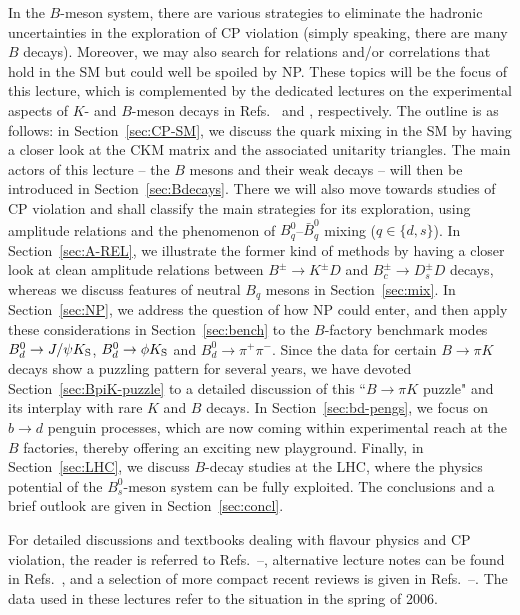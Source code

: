\documentclass[11pt]{cernrep}
\begin{document}
In the $B$-meson system, there are various strategies to eliminate
the hadronic uncertainties in the exploration of CP violation (simply
speaking, there are many $B$ decays). Moreover, we may also search
for relations and/or correlations that hold in the SM but could well be
spoiled by NP. These topics will be the focus of this lecture, which is
complemented by the dedicated lectures on the experimental aspects 
of $K$- and $B$-meson decays in Refs.~\cite{jeitler} and \cite{widhalm}, respectively. 
The outline is as follows: in Section~\ref{sec:CP-SM}, we discuss the quark 
mixing in the SM by having a closer look at the CKM matrix and the
associated unitarity triangles. The main actors of this lecture -- the
$B$ mesons and their weak decays -- will then be introduced in 
Section~\ref{sec:Bdecays}. There we will also move towards studies
of CP violation and shall classify the main strategies for its exploration,
using amplitude relations and the phenomenon of $B^0_q$--$\bar B^0_q$ 
mixing ($q\in\{d,s\}$). In Section~\ref{sec:A-REL}, we illustrate the former 
kind of methods by having a closer look at clean amplitude relations between
$B^\pm\to K^\pm D$ and $B_c^\pm\to D_s^\pm D$ decays, whereas we discuss 
features of neutral
$B_q$ mesons in Section~\ref{sec:mix}. In Section~\ref{sec:NP}, we address the question of how NP could enter, and then apply these considerations in 
Section~\ref{sec:bench} to the $B$-factory benchmark modes 
$B^0_d\to J/\psi K_{\rm S}$, $B^0_d\to \phi K_{\rm S}$ and $B^0_d\to\pi^+\pi^-$.
Since the data for certain $B\to\pi K$
decays show a puzzling pattern for several years, we have devoted 
Section~\ref{sec:BpiK-puzzle} to a detailed discussion of this ``$B\to\pi K$
puzzle" and its interplay with rare $K$ and $B$ decays. In Section~\ref{sec:bd-pengs}, 
we focus on $b\to d$ penguin processes, which are now coming within experimental 
reach at the $B$ factories, thereby offering an exciting new playground. Finally, 
in Section~\ref{sec:LHC}, we discuss $B$-decay studies at the  LHC, where the 
physics potential of the $B^0_s$-meson system can be fully exploited. 
The conclusions and a brief outlook are given in Section~\ref{sec:concl}.

For detailed discussions and textbooks dealing with flavour physics and CP violation, 
the reader is referred to Refs.~\cite{BF-rev}--\cite{mannel-book}, alternative lecture 
notes can be found in Refs.~\cite{nir-argentina, buras-spain}, and a selection 
of more compact recent reviews is given in Refs.~\cite{ali-rev}--\cite{HoLi-rev}.
The data used in these lectures refer to the situation in the spring of 2006.
\end{document}
